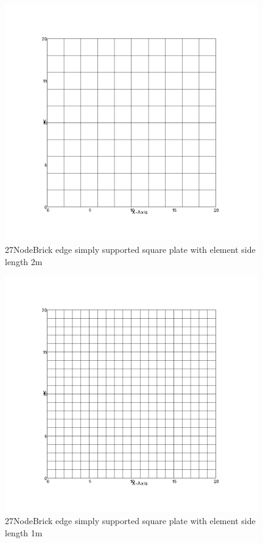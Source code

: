 \documentclass[fleqn,11pt,letter]{article}
\begin{document}
\begin{figure}[H]
  \centering
  \includegraphics[width=11cm]{../Figure_files/27NodeBrick/square_plate3.png}
  \caption{27NodeBrick edge simply supported square plate with element side length 2m }
  \label{fig 27NodeBrick edges simply supported square plate with element side length 2m }
\end{figure}

\newpage

\begin{figure}[H]
  \centering
  \includegraphics[width=11cm]{../Figure_files/27NodeBrick/square_plate4.png}
  \caption{27NodeBrick edge simply supported square plate with element side length 1m }
  \label{fig 27NodeBrick edges simply supported square plate with element side length 1m }
\end{figure}
\end{document}
